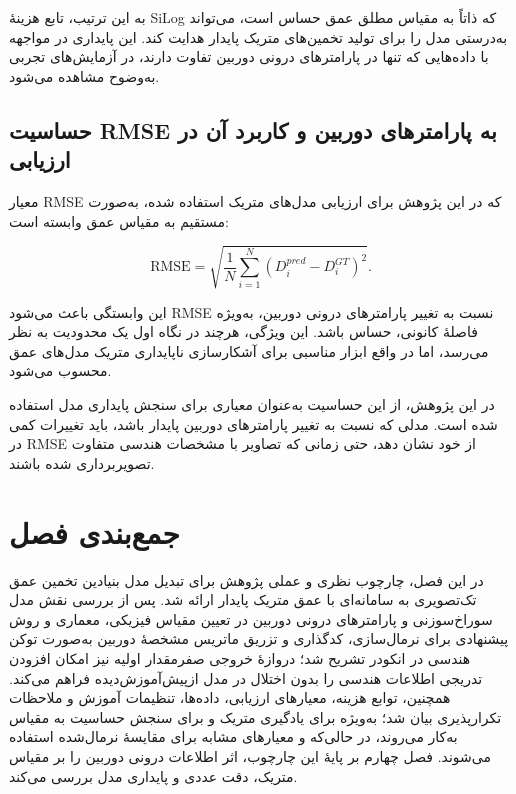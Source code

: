 به این ترتیب، تابع هزینهٔ SiLog که ذاتاً به مقیاس مطلق عمق حساس است، می‌تواند به‌درستی مدل را برای تولید تخمین‌های متریک پایدار هدایت کند. این پایداری در مواجهه با داده‌هایی که تنها در پارامترهای درونی دوربین تفاوت دارند، در آزمایش‌های تجربی به‌وضوح مشاهده می‌شود.

\subsection{حساسیت RMSE به پارامترهای دوربین و کاربرد آن در ارزیابی}

معیار RMSE که در این پژوهش برای ارزیابی مدل‌های متریک استفاده شده، به‌صورت مستقیم به مقیاس عمق وابسته است:

\begin{equation}
\text{RMSE} = \sqrt{\frac{1}{N}\sum_{i=1}^{N} (D_i^{pred} - D_i^{GT})^2}.
\end{equation}

این وابستگی باعث می‌شود RMSE نسبت به تغییر پارامترهای درونی دوربین، به‌ویژه فاصلهٔ کانونی، حساس باشد. این ویژگی، هرچند در نگاه اول یک محدودیت به نظر می‌رسد، اما در واقع ابزار مناسبی برای آشکارسازی ناپایداری متریک مدل‌های عمق محسوب می‌شود.

در این پژوهش، از این حساسیت به‌عنوان معیاری برای سنجش پایداری مدل استفاده شده است. مدلی که نسبت به تغییر پارامترهای دوربین پایدار باشد، باید تغییرات کمی در RMSE از خود نشان دهد، حتی زمانی که تصاویر با مشخصات هندسی متفاوت تصویربرداری شده باشند.

\section{جمع‌بندی فصل}
\label{sec:chapter3_summary}

در این فصل، چارچوب نظری و عملی پژوهش برای تبدیل مدل بنیادین تخمین عمق تک‌تصویری به سامانه‌ای با عمق متریک پایدار ارائه شد. پس از بررسی نقش مدل سوراخ‌سوزنی و پارامترهای درونی دوربین در تعیین مقیاس فیزیکی، معماری  و روش پیشنهادی برای نرمال‌سازی، کدگذاری و تزریق ماتریس مشخصهٔ دوربین به‌صورت توکن هندسی در انکودر تشریح شد؛ دروازهٔ خروجی صفرمقدار اولیه نیز امکان افزودن تدریجی اطلاعات هندسی را بدون اختلال در مدل ازپیش‌آموزش‌دیده فراهم می‌کند. همچنین، توابع هزینه، معیارهای ارزیابی، داده‌ها، تنظیمات آموزش و ملاحظات تکرارپذیری بیان شد؛ به‌ویژه  برای یادگیری متریک و  برای سنجش حساسیت به مقیاس به‌کار می‌روند، در حالی‌که  و معیارهای مشابه برای مقایسهٔ نرمال‌شده استفاده می‌شوند. فصل چهارم بر پایهٔ این چارچوب، اثر اطلاعات درونی دوربین را بر مقیاس متریک، دقت عددی و پایداری مدل بررسی می‌کند.
